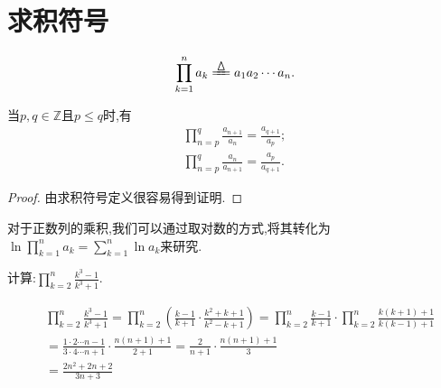 \documentclass[../../main.tex]{subfiles}%
\begin{document}
\section{求积符号}

\begin{definition}[求积符号]\label{definition:求积符号}
\begin{align*}
\prod_{k=1}^n{a_k}\xlongequal{\bigtriangleup}a_1a_2\cdots a_n. 
\end{align*}
\end{definition}

\begin{theorem}[基本结论]\label{theorem:求积符号基本结论}
当$p,q\in \mathbb{Z}$且$p\leqslant  q$时,有
\begin{gather*}
\prod_{n=p}^q{\frac{a_{n+1}}{a_n}}=\frac{a_{q+1}}{a_p};
\\
\prod_{n=p}^q{\frac{a_n}{a_{n+1}}}=\frac{a_p}{a_{q+1}}.
\end{gather*}
\end{theorem}
\begin{proof}
由求积符号定义很容易得到证明.
\end{proof}
\begin{remark}
对于正数列的乘积,我们可以通过取对数的方式,将其转化为$\ln \prod_{k=1}^n{a_k}=\sum\limits_{k=1}^n{\ln a_k}$来研究.
\end{remark}
\begin{example}
计算:$\prod_{k=2}^n{\frac{k^3-1}{k^3+1}}$.
\end{example}
\begin{solution}
\begin{align*}
&\prod_{k=2}^n{\frac{k^3-1}{k^3+1}}=\prod_{k=2}^n{\left( \frac{k-1}{k+1}\cdot \frac{k^2+k+1}{k^2-k+1} \right)}=\prod_{k=2}^n{\frac{k-1}{k+1}\cdot}\prod_{k=2}^n{\frac{k\left( k+1 \right) +1}{k\left( k-1 \right) +1}}
\\
&=\frac{1\cdot 2\cdots n-1}{3\cdot 4\cdots n+1}\cdot \frac{n\left( n+1 \right) +1}{2+1}=\frac{2}{n+1}\cdot \frac{n\left( n+1 \right) +1}{3}
\\
&=\frac{2n^2+2n+2}{3n+3}
\end{align*}

\end{solution}
\end{document}
